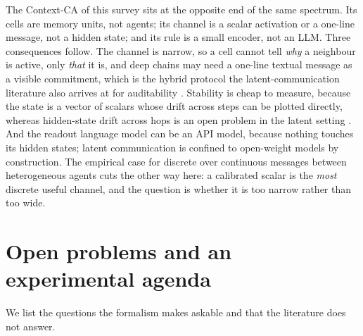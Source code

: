 \documentclass[11pt]{article}
\begin{document}
The Context-CA of this survey sits at the opposite end of the same spectrum. Its cells are memory units, not agents; its channel is a scalar activation or a one-line message, not a hidden state; and its rule is a small encoder, not an LLM. Three consequences follow. The channel is narrow, so a cell cannot tell \emph{why} a neighbour is active, only \emph{that} it is, and deep chains may need a one-line textual message as a visible commitment, which is the hybrid protocol the latent-communication literature also arrives at for auditability \cite{beyondtokens}. Stability is cheap to measure, because the state is a vector of scalars whose drift across steps can be plotted directly, whereas hidden-state drift across hops is an open problem in the latent setting \cite{causalaudit}. And the readout language model can be an API model, because nothing touches its hidden states; latent communication is confined to open-weight models by construction. The empirical case for discrete over continuous messages between heterogeneous agents \cite{discretemsg} cuts the other way here: a calibrated scalar is the \emph{most} discrete useful channel, and the question is whether it is too narrow rather than too wide.

\section{Open problems and an experimental agenda}

We list the questions the formalism makes askable and that the literature does not answer.
\end{document}

